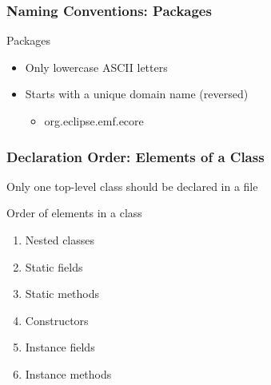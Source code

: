 \documentclass[screen]{beamer}
\begin{document}
\begin{frame}[fragile]
\frametitle{Naming Conventions: Packages}%
%
\begin{block}{Packages}
	\begin{itemize}
		\item Only lowercase ASCII letters
		\item Starts with a unique domain name (reversed)
			\begin{itemize}
				\item org.eclipse.emf.ecore
			\end{itemize}
	\end{itemize}
\end{block}
\end{frame}
\begin{frame}[fragile]
\frametitle{Declaration Order: Elements of a Class}%
%
\begin{block}{Only one top-level class should be declared in a file}
\end{block}
\begin{block}{Order of elements in a class}
	\begin{enumerate}
		\item Nested classes
		\item Static fields
		\item Static methods
		\item Constructors
		\item Instance fields
		\item Instance methods
	\end{enumerate}
\end{block}
\end{frame}
\end{document}
